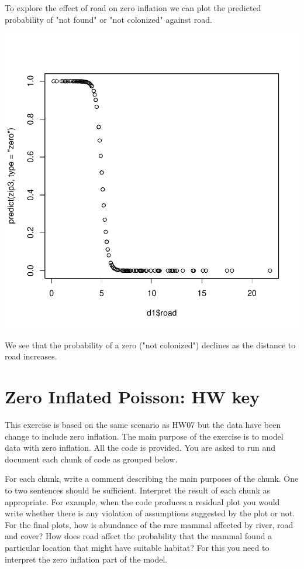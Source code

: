 \documentclass{article}
\begin{document}
To explore the effect of road on zero inflation we can plot the predicted probability of "not found" or "not colonized" against road.


\begin{Schunk}
\end{Schunk}
\includegraphics{HW08ZIPlogistic-012}

We see that the probability of a zero ("not colonized") declines as the distance to road increases.

\section {Zero Inflated Poisson: HW key}

This exercise is based on the same scenario as HW07 but the data have been change to include zero inflation. The main purpose of the exercise is to model data with zero inflation. All the code is provided. You are asked to run and document each chunk of code as grouped below.

For each chunk, write a comment describing the main purposes of the chunk. One to two sentences should be sufficient.
Interpret the result of each chunk as appropriate. For example, when the code produces a residual plot you would write whether there is any violation of assumptions suggested by the plot or not. For the final plots, how is abundance of the rare mammal affected by river, road and cover?
How does road affect the probability that the mammal found a particular location that might have suitable habitat? For this you need to interpret the zero inflation part of the model.
\end{document}
